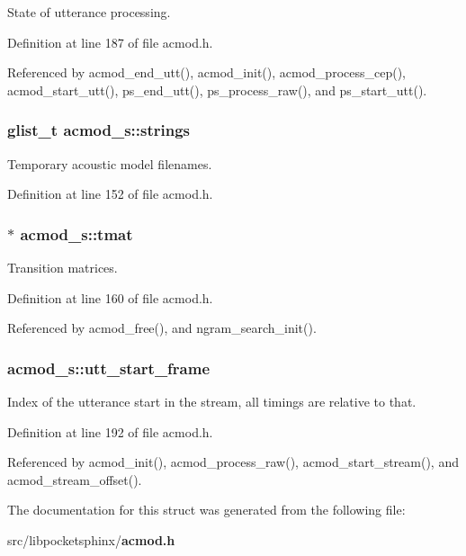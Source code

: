 State of utterance processing. 



Definition at line 187 of file acmod.\-h.



Referenced by acmod\-\_\-end\-\_\-utt(), acmod\-\_\-init(), acmod\-\_\-process\-\_\-cep(), acmod\-\_\-start\-\_\-utt(), ps\-\_\-end\-\_\-utt(), ps\-\_\-process\-\_\-raw(), and ps\-\_\-start\-\_\-utt().

\subsubsection[{strings}]{\setlength{\rightskip}{0pt plus 5cm}glist\-\_\-t acmod\-\_\-s\-::strings}\label{structacmod__s_a9f6b699a0fbd43cf7ababab6f0ab81be}


Temporary acoustic model filenames. 



Definition at line 152 of file acmod.\-h.

\subsubsection[{tmat}]{$\ast$ acmod\-\_\-s\-::tmat}\label{structacmod__s_aaa3982184a49f0d61e397ba89f486259}


Transition matrices. 



Definition at line 160 of file acmod.\-h.



Referenced by acmod\-\_\-free(), and ngram\-\_\-search\-\_\-init().

\subsubsection[{utt\-\_\-start\-\_\-frame}]{ acmod\-\_\-s\-::utt\-\_\-start\-\_\-frame}\label{structacmod__s_aecf7cf72f18a8ecb1cc8e96928bc1ad4}


Index of the utterance start in the stream, all timings are relative to that. 



Definition at line 192 of file acmod.\-h.



Referenced by acmod\-\_\-init(), acmod\-\_\-process\-\_\-raw(), acmod\-\_\-start\-\_\-stream(), and acmod\-\_\-stream\-\_\-offset().



The documentation for this struct was generated from the following file\-:\begin{DoxyCompactItemize}
\item 
src/libpocketsphinx/{\bf acmod.\-h}\end{DoxyCompactItemize}
